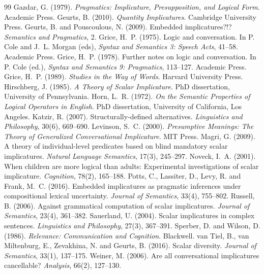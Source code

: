 \documentclass{situationist-preprint}
\begin{document}
\begin{thebibliography}{99}
 Gazdar, G. (1979). \emph{Pragmatics: Implicature, Presupposition, and Logical Form}. Academic Press.
 Geurts, B. (2010). \emph{Quantity Implicatures}. Cambridge University Press.
 Geurts, B. and Pouscoulous, N. (2009). Embedded implicatures?!? \emph{Semantics and Pragmatics}, 2.
 Grice, H.~P. (1975). Logic and conversation. In P. Cole and J.~L. Morgan (eds), \emph{Syntax and Semantics 3: Speech Acts}, 41--58. Academic Press.
 Grice, H.~P. (1978). Further notes on logic and conversation. In P. Cole (ed.), \emph{Syntax and Semantics 9: Pragmatics}, 113--127. Academic Press.
 Grice, H.~P. (1989). \emph{Studies in the Way of Words}. Harvard University Press.
 Hirschberg, J. (1985). \emph{A Theory of Scalar Implicature}. PhD dissertation, University of Pennsylvania.
 Horn, L.~R. (1972). \emph{On the Semantic Properties of Logical Operators in English}. PhD dissertation, University of California, Los Angeles.
 Katzir, R. (2007). Structurally-defined alternatives. \emph{Linguistics and Philosophy}, 30(6), 669--690.
 Levinson, S.~C. (2000). \emph{Presumptive Meanings: The Theory of Generalized Conversational Implicature}. MIT Press.
 Magri, G. (2009). A theory of individual-level predicates based on blind mandatory scalar implicatures. \emph{Natural Language Semantics}, 17(3), 245--297.
 Noveck, I.~A. (2001). When children are more logical than adults: Experimental investigations of scalar implicature. \emph{Cognition}, 78(2), 165--188.
 Potts, C., Lassiter, D., Levy, R. and Frank, M.~C. (2016). Embedded implicatures as pragmatic inferences under compositional lexical uncertainty. \emph{Journal of Semantics}, 33(4), 755--802.
 Russell, B. (2006). Against grammatical computation of scalar implicatures. \emph{Journal of Semantics}, 23(4), 361--382.
 Sauerland, U. (2004). Scalar implicatures in complex sentences. \emph{Linguistics and Philosophy}, 27(3), 367--391.
 Sperber, D. and Wilson, D. (1986). \emph{Relevance: Communication and Cognition}. Blackwell.
 van Tiel, B., van Miltenburg, E., Zevakhina, N. and Geurts, B. (2016). Scalar diversity. \emph{Journal of Semantics}, 33(1), 137--175.
 Weiner, M. (2006). Are all conversational implicatures cancellable? \emph{Analysis}, 66(2), 127--130.
\end{thebibliography}
\end{document}

